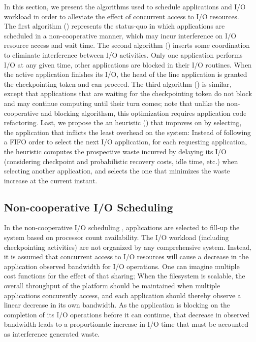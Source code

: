 In this section, we present the algorithms used to schedule applications
and I/O workload in order to alleviate the effect of concurrent access
to I/O resources. The first algorithm (\nocoop) represents the status-quo  in
which applications are scheduled in a non-cooperative manner, which may
incur interference on I/O resource access and wait time. The second
algorithm (\fifoblock) inserts some coordination to eliminate interference
between I/O activities. Only one application performs I/O at any given
time, other applications are blocked in their
I/O routines. When the active application finishes its I/O, the head of
the line application is granted the checkpointing token and can proceed.
The third algorithm (\fifononblock) is similar, except that
applications that are waiting for the checkpointing token do not block
and may continue computing until their turn comes; note that unlike the
non-cooperative and blocking algorithsm, this optimization requires
application code refactoring. Last, we propose the an heuristic
(\leastwaste) that improves on \fifononblock by selecting,
the application that inflicts the least overhead on the system:
Instead of following a FIFO order to select the next I/O application,
for each requesting application, the heuristic computes the prospective
waste incurred by delaying its I/O (considering checkpoint and
probabilistic recovery costs, idle time, etc.) when selecting another
application, and selects the one that minimizes the waste increase
at the current instant.

\subsection{Non-cooperative I/O Scheduling}

In the non-cooperative I/O scheduling \nocoop, applications are selected to
fill-up the system based on processor count availability. The I/O
workload (including checkpointing activities) are not organized by any
comprehensive system. Instead, it is assumed that concurrent access
to I/O resources will cause a decrease in the application observed
bandwidth for I/O operations. One can imagine multiple cost functions
for the effect of that sharing; When the filesystem is scalable, the
overall throughput of the platform should be maintained when multiple
applications concurently access, and each application should thereby
observe a linear decrease in its own bandwidth. As the application is
blocking on the completion of its I/O operations before it can continue,
that decrease in observed bandwidth leads to a proportionate increase in
I/O time that must be accounted as interference generated waste.

